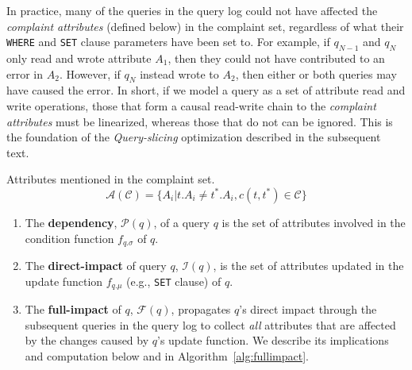 In practice, many of the queries in the query log could not have affected the 
{\it complaint attributes} (defined below) in the complaint set, regardless of what their \texttt{WHERE} 
and \texttt{SET} clause parameters have been set to. For example, if $q_{N-1}$ and $q_{N}$ 
only read and wrote attribute $A_1$, then they could not have contributed to an error in $A_2$.  
However, if $q_{N}$ instead wrote to $A_2$, then either or both queries may have caused the error. 
In short, if we model a query as a set of attribute read and write operations, those that form a 
causal read-write chain to the {\it complaint attributes} must be linearized, whereas those that
do not can be ignored.  This is the foundation of the {\it Query-slicing} optimization described in 
the subsequent text.


\begin{definition} 
	Attributes mentioned in the complaint set.
	\[\mathcal{A}(\mathcal{C}) = \{A_i | t.A_i \neq t^*.A_i, c(t,t^*) \in \mathcal{C}\}\]
\end{definition} 


\begin{definition}
  \begin{enumerate}
    \item The \textbf{dependency}, $\mathcal{P}(q)$, of a query $q$
    is the set of attributes  involved in the condition function $f_{q.\sigma}$ of $q$.
    \item The \textbf{direct-impact} of query $q$, 
    $\mathcal{I}(q)$, is the set of attributes 
    updated in the update function $f_{q.\mu}$ 
    (e.g., \texttt{SET} clause) of $q$.
    \item The \textbf{full-impact}
    of $q$, $\mathcal{F}(q)$, propagates $q$'s direct impact through
    the subsequent queries in the query log to collect {\it all} attributes
    that are affected by the changes caused by $q$'s update function.
    We describe its implications and computation below and in Algorithm~\ref{alg:fullimpact}.
  \end{enumerate}
\end{definition}

